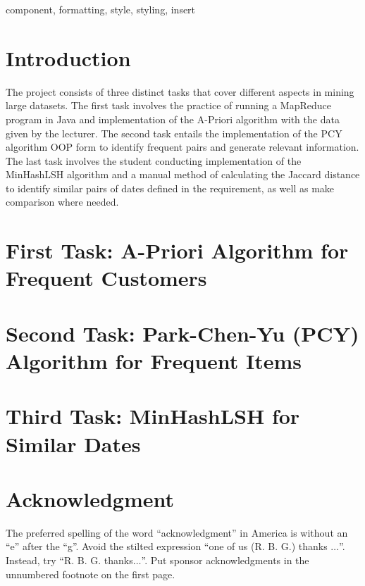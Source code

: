 \documentclass[conference]{IEEEtran}
\begin{document}
    \begin{IEEEkeywords}
        component, formatting, style, styling, insert
    \end{IEEEkeywords}

    \section{Introduction}
    \label{sec:introduction}

    The project consists of three distinct tasks that cover different aspects in mining large datasets.
    The first task involves the practice of running a MapReduce program in Java and implementation of the A-Priori algorithm with the data given by the lecturer.
    The second task entails the implementation of the PCY algorithm OOP form to identify frequent pairs and generate relevant information.
    The last task involves the student conducting implementation of the MinHashLSH algorithm and a manual method of calculating the Jaccard distance to identify similar pairs of dates defined in the requirement, as well as make comparison where needed.

    \section{First Task: A-Priori Algorithm for Frequent Customers}
    \label{sec:first-task}
    

    \section{Second Task: Park-Chen-Yu (PCY) Algorithm for Frequent Items}
    \label{sec:second-task}
    

    \section{Third Task: MinHashLSH for Similar Dates}
    \label{sec:third-task}
%    

    \section*{Acknowledgment}

    The preferred spelling of the word ``acknowledgment'' in America is without an ``e'' after the ``g''.
    Avoid the stilted expression ``one of us (R. B. G.) thanks $\ldots$''.
    Instead, try ``R. B. G. thanks$\ldots$''.
    Put sponsor acknowledgments in the unnumbered footnote on the first page.
\end{document}
